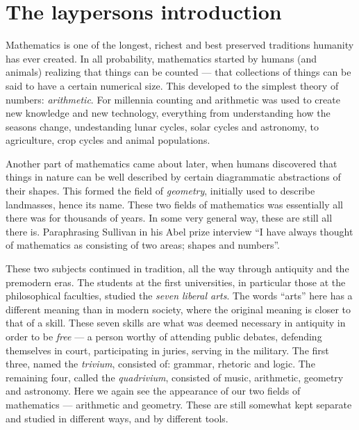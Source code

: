 
\section{The laypersons introduction}

Mathematics is one of the longest, richest and best preserved traditions humanity has ever created. In all probability, mathematics started by humans (and animals) realizing that things can be counted --- that collections of things can be said to have a certain numerical size. This developed to the simplest theory of numbers: \emph{arithmetic}. For millennia counting and arithmetic was used to create new knowledge and new technology, everything from understanding how the seasons change, undestanding lunar cycles, solar cycles and astronomy, to agriculture, crop cycles and animal populations. 

Another part of mathematics came about later, when humans discovered that things in nature can be well described by certain diagrammatic abstractions of their shapes. This formed the field of \emph{geometry}, initially used to describe landmasses, hence its name. These two fields of mathematics was essentially all there was for thousands of years. In some very general way, these are still all there is. Paraphrasing Sullivan in his Abel prize interview ``I have always thought of mathematics as consisting of two areas; shapes and numbers''. 

These two subjects continued in tradition, all the way through antiquity and the premodern eras. The students at the first universities, in particular those at the philosophical faculties, studied the \emph{seven liberal arts}. The words ``arts'' here has a different meaning than in modern society, where the original meaning is closer to that of a skill. These seven skills are what was deemed necessary in antiquity in order to be \emph{free} --- a person worthy of attending public debates, defending themselves in court, participating in juries, serving in the military. The first three, named the \emph{trivium}, consisted of: grammar, rhetoric and logic. The remaining four, called the \emph{quadrivium}, consisted of music, arithmetic, geometry and astronomy. Here we again see the appearance of our two fields of mathematics --- arithmetic and geometry. These are still somewhat kept separate and studied in different ways, and by different tools. 

